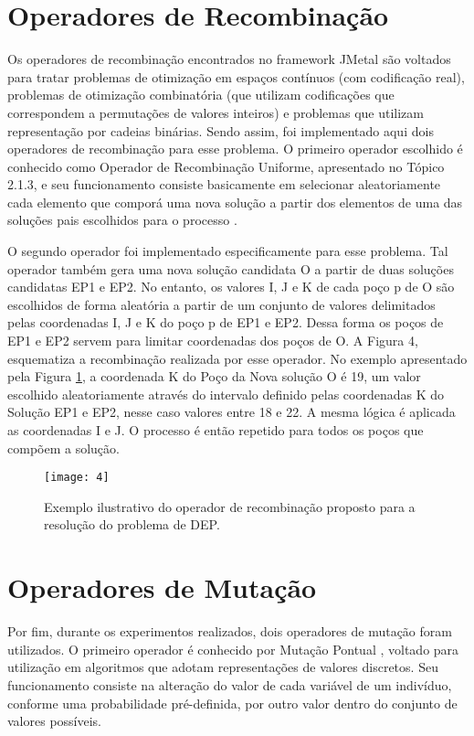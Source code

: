 \section{Operadores de Recombinação}

Os operadores de recombinação encontrados no framework JMetal são voltados para tratar problemas de otimização em espaços contínuos (com codificação real), problemas de otimização combinatória (que utilizam codificações que correspondem a permutações de valores inteiros) e problemas que utilizam representação por cadeias binárias. Sendo assim, foi implementado aqui dois operadores de recombinação para esse problema. O primeiro operador escolhido é conhecido como Operador de Recombinação Uniforme, apresentado no Tópico 2.1.3, e seu funcionamento consiste basicamente em selecionar aleatoriamente cada elemento que comporá uma nova solução a partir dos elementos de uma das soluções pais escolhidos para o processo \cite{Talbi2009, Kacprzyk2015}.

O segundo operador foi implementado especificamente para esse problema.  Tal operador também gera uma nova solução candidata O a partir de duas soluções candidatas EP1 e EP2. No entanto, os valores I, J e K de cada poço p de O são escolhidos de forma aleatória a partir de um conjunto de valores delimitados pelas coordenadas I, J e K do poço p de EP1 e EP2. Dessa forma os poços de EP1 e EP2 servem para limitar coordenadas dos poços de O. A Figura 4, esquematiza a recombinação realizada por esse operador. No exemplo apresentado pela Figura \ref{fig:fig3_2}, a coordenada K do Poço da Nova solução O é 19, um valor escolhido aleatoriamente através do intervalo definido pelas coordenadas K do Solução EP1 e EP2, nesse caso valores entre 18 e 22. A mesma lógica é aplicada as coordenadas I e J. O processo é então repetido para todos os poços que compõem a solução.

\begin{figure}[htb]
  \centering
  \texttt{[image: 4]}
  \caption{Exemplo ilustrativo do operador de recombinação proposto para a resolução do problema de DEP.}
  \label{fig:fig3_2}
\end{figure}

\section{Operadores de Mutação}

Por fim, durante os experimentos realizados, dois operadores de mutação foram utilizados. O primeiro operador é conhecido por Mutação Pontual \cite{Kacprzyk2015}, voltado para utilização em algoritmos que adotam representações de valores discretos. Seu funcionamento consiste na alteração do valor de cada variável de um indivíduo, conforme uma probabilidade pré-definida, por outro valor dentro do conjunto de valores possíveis.


